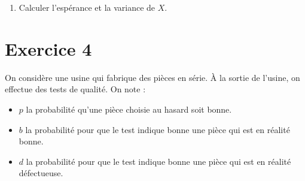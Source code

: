 \begin{enumerate}
{\begin{solution}
            On en déduit que $F(1/2) = 1/8$, Or
            \begin{align*}
                F(1/2) = a \frac{(1/2)^3}{3} + b \frac{1}{2} = a \frac{1}{24} + b \frac{1}{2}.
            \end{align*}
            En multipliant par $24$, on obtient :
            \begin{align*}
                a + 12 b = 3\,.
            \end{align*}
            On avait déjà $a + 3b = 3$. On peut donc résoudre pour obtenir $a = 3$ et $b = 0$.

        \end{solution}
    }{}
    \item Calculer l'espérance et la variance de $X$.
\end{enumerate}

\vspace{0.8cm}

\section*{Exercice 4}
On considère une usine qui fabrique des pièces en série. À la sortie de l'usine, on effectue des tests de qualité. On note :
\begin{itemize}
    \item $p$ la probabilité qu'une pièce choisie au hasard soit bonne.
    \item $b$ la probabilité pour que le test indique bonne une pièce qui est en réalité bonne.
    \item $d$ la probabilité pour que le test indique bonne une pièce qui est en réalité défectueuse.
\end{itemize}

